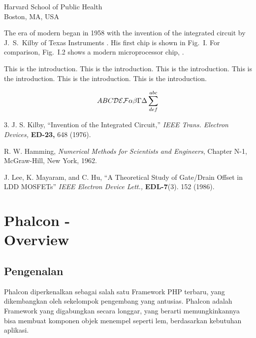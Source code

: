 \documentclass{wileySix}
\begin{document}
\begin{introduction}


{Harvard School of Public Health\\
Boston, MA, USA}

The era of modern 
began in 1958 with the invention of the
integrated circuit by J.~S.~Kilby
 of Texas Instruments \cite{kilby}.
His first chip is shown in Fig.~I. For comparison,
Fig.~I.2 shows a modern microprocessor chip, \cite{beren}.


This is the introduction.
This is the introduction.
This is the introduction.
This is the introduction.
This is the introduction.
This is the introduction.

\begin{equation}
ABC {\cal DEF} \alpha\beta\Gamma\Delta\sum^{abc}_{def}
\end{equation}


\begin{chapreferences}{3.}
J. S. Kilby,
``Invention of the Integrated Circuit,'' {\it IEEE Trans. Electron Devices,}
{\bf ED-23,} 648 (1976).

R. W. Hamming,
                 {\it Numerical Methods for Scientists and
                 Engineers}, Chapter N-1, McGraw-Hill,
                 New York, 1962.

J. Lee, K. Mayaram, and C. Hu, ``A Theoretical
               Study of Gate/Drain Offset in LDD MOSFETs''
                     {\it IEEE Electron Device Lett.,} {\bf EDL-7}(3). 152
                     (1986).
\end{chapreferences}
\end{introduction}


\chapter[Phalcon - Overview]
{Phalcon -\\ Overview}
\section{Pengenalan}
Phalcon diperkenalkan sebagai salah satu Framework PHP terbaru, yang dikembangkan oleh sekelompok pengembang yang antusias. Phalcon adalah Framework yang digabungkan secara longgar, yang berarti memungkinkannya bisa membuat komponen objek menempel seperti lem, berdasarkan kebutuhan aplikasi.
\end{document}
